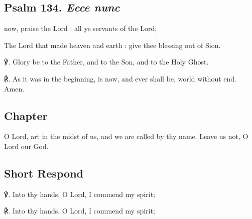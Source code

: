 \begin{multicols}{2}
\subsection{Psalm 134. \textit{Ecce nunc}}
 now, praise the Lord : all ye servants of the Lord;\par
{}
The Lord that made heaven and earth : give thee blessing out of Sion.\par
℣. Glory be to the Father, and to the Son, and to the Holy Ghost.\par
℟. As it was in the beginning, is now, and ever shall be, world without end. Amen.

\subsection{Chapter}
 O Lord, art in the midst of us, and we are called by thy name. Leave us not, O Lord our God.

\subsection{Short Respond}
℣. Into thy hands, O Lord, I commend my spirit;

℟. Into thy hands, O Lord, I commend my spirit;


\end{multicols}
